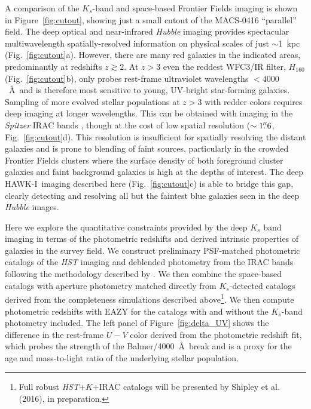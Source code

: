 \documentclass[preprint2]{aastex6}
\gdef\HAWKI{\mbox{HAWK-I}}
\begin{document}
A comparison of the $K_s$-band and space-based Frontier Fields imaging is shown in Figure~\ref{fig:cutout}, showing just a small cutout of the MACS-0416 ``parallel'' field.  The deep optical and near-infrared \textit{Hubble} imaging provides spectacular multiwavelength spatially-resolved information on physical scales of just $\sim$1~kpc (Fig.~\ref{fig:cutout}a).  However, there are many red galaxies in the indicated areas, predominantly at redshifts $z\gtrsim2$.  At $z>3$ even the reddest WFC3/IR filter, $H_{160}$ (Fig.~\ref{fig:cutout}b), only probes rest-frame ultraviolet wavelengths $<4000$~\AA\ and is therefore most sensitive to young, UV-bright star-forming galaxies.  Sampling of more evolved stellar populations at $z>3$ with redder colors requires deep imaging at longer wavelengths.  This can be obtained with imaging in the \textit{Spitzer} IRAC bands \citep[e.g.,][]{marchesini:10, stefanon:13, stefanon:15}, though at the cost of low spatial resolution ($\sim1\mbox{$.\!\!^{\prime\prime}$}6$, Fig.~\ref{fig:cutout}d).  This resolution is insufficient for spatially resolving the distant galaxies and is prone to blending of faint sources, particularly in the crowded Frontier Fields clusters where the surface density of both foreground cluster galaxies and faint background galaxies is high at the depths of interest.  The deep \HAWKI\ imaging described here (Fig.~\ref{fig:cutout}c) is able to bridge this gap, clearly detecting and resolving all but the faintest blue galaxies seen in the deep \textit{Hubble} images.  

Here we explore the quantitative constraints provided by the deep $K_s$ band imaging in terms of the photometric redshifts and derived intrinsic properties of galaxies in the survey field.  We construct preliminary PSF-matched photometric catalogs of the \textit{HST} imaging and deblended photometry from the IRAC bands following the methodology described by \cite{skelton:14}. We then combine the space-based catalogs with aperture photometry matched directly from $K_s$-detected catalogs derived from the completeness simulations described above\footnote{Full robust \textit{HST}+$K$+IRAC catalogs will be presented by Shipley et al. (2016), in preparation.}.  We then compute photometric redshifts with EAZY \citep{brammer:08} for the catalogs with and without the $K_s$-band photometry included.  The left panel of Figure~\ref{fig:delta_UV} shows the difference in the rest-frame $U-V$ color derived from the photometric redshift fit, which probes the strength of the Balmer/4000~\AA\ break and is a proxy for the age and mass-to-light ratio of the underlying stellar population.  
\end{document}
